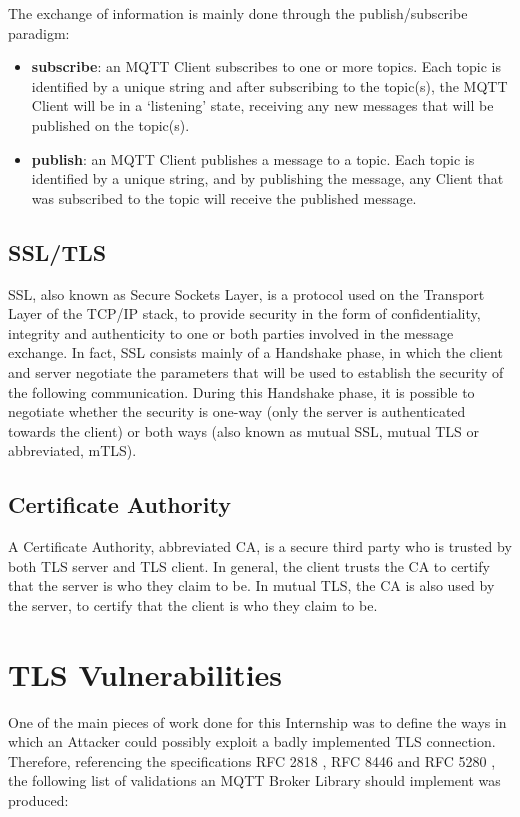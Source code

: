 \documentclass[binding=0.6cm,noexaminfo]{sapthesis}
\begin{document}
The exchange of information is mainly done through the publish/subscribe paradigm:
\begin{itemize}
	\item \textbf{subscribe}: an MQTT Client subscribes to one or more topics. Each topic is identified by a unique string and after subscribing to the topic(s), the MQTT Client will be in a `listening' state, receiving any new messages that will be published on the topic(s).
	\item \textbf{publish}: an MQTT Client publishes a message to a topic. Each topic is identified by a unique string, and by publishing the message, any Client that was subscribed to the topic will receive the published message.
\end{itemize}

\subsection{SSL/TLS}
SSL, also known as Secure Sockets Layer, is a protocol used on the Transport Layer of the TCP/IP stack, to provide security in the form of confidentiality, integrity and authenticity to one or both parties involved in the message exchange. In fact, SSL consists mainly of a Handshake phase, in which the client and server negotiate the parameters that will be used to establish the security of the following communication. During this Handshake phase, it is possible to negotiate whether the security is one-way (only the server is authenticated towards the client) or both ways (also known as mutual SSL, mutual TLS or abbreviated, mTLS).

\subsection{Certificate Authority}
A Certificate Authority, abbreviated CA, is a secure third party who is trusted by both TLS server and TLS client. In general, the client trusts the CA to certify that the server is who they claim to be. In mutual TLS, the CA is also used by the server, to certify that the client is who they claim to be.

\section{TLS Vulnerabilities}
One of the main pieces of work done for this Internship was to define the ways in which an Attacker could possibly exploit a badly implemented TLS connection. Therefore, referencing the specifications RFC 2818 \cite{rfc2818}, RFC 8446 \cite{rfc8446} and RFC 5280 \cite{rfc5280}, the following list of validations an MQTT Broker Library should implement was produced:
\end{document}
